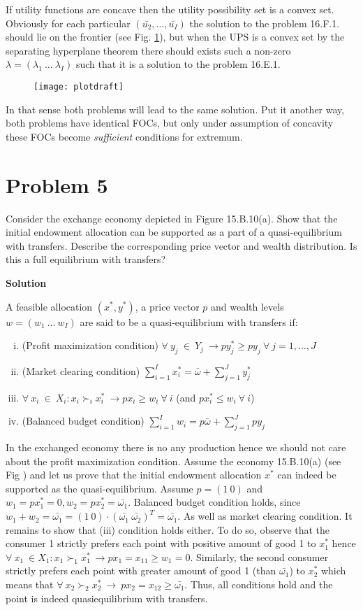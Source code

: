 \documentclass[a4paper]{article}
\begin{document}
If utility functions are concave then the utility possibility set is a convex set. Obviously for each particular $(\bar{u_2}, \dots, \bar{u_I})$ the solution to the problem 16.F.1. should lie on the frontier (see Fig. \ref{fig2}), but when the UPS is a convex set by the separating hyperplane theorem there should exists such a non-zero $\lambda = (\lambda_1\ \dots\ \lambda_I)$ such that it is a solution to the problem 16.E.1.
	\begin{figure}[h]
	\centering
	\texttt{[image: plotdraft]}
	\caption{}\label{fig2}
\end{figure}
In that sense both problems will lead to the same solution. Put it another way, both problems have identical FOCs, but only under assumption of concavity these FOCs become \textit{sufficient} conditions for extremum.
\section*{Problem 5}
Consider the exchange economy depicted in Figure 15.B.10(a). Show that the initial
endowment allocation can be supported as a part of a quasi-equilibrium with transfers.
Describe the corresponding price vector and wealth distribution. Is this a full equilibrium
with transfers?


\textbf{Solution}



A feasible allocation $(x^*, y^*)$, a price vector $p$ and wealth levels $w = (w_1\ \dots\ w_I)$ are said to be a quasi-equilibrium with transfers if:
\begin{enumerate}[(i)]
	\item (Profit maximization condition) $\forall\ y_j\ \in\ Y_j\ \to py_j^* \ge py_j\ \forall\ j = 1, \dots, J$
	\item (Market clearing condition) $\sum_{i=1}^I x^*_i = \bar{\omega} + \sum_{j=1}^Jy^*_j$
	\item $\forall\ x_i\ \in\ X_i: x_i \succ_i x_i^*\ \to px_i \ge w_i\ \forall\ i$ (and $px_i^* \le w_i\ \forall\ i$)
	\item (Balanced budget condition) $\sum_{i=1}^Iw_i = p\bar{\omega} + \sum_{j=1}^J py_j$
\end{enumerate}
In the exchanged economy there is no any production hence we should not care about the profit maximization condition. Assume the economy 15.B.10(a) (see Fig ) and let us prove that the initial endowment allocation $x^*$ can indeed be supported as the quasi-equilibrium. Assume $p = (1\ 0)$ and $w_1 = px_1^* = 0, w_2 = px^*_2 = \bar{\omega_1}$. Balanced budget condition holds, since $w_1 + w_2 = \bar{\omega_1} = (1\ 0) \cdot (\bar{\omega_1}\ \bar{\omega_2})^T = \bar{\omega_1}$. As well as market clearing condition. It remains to show that (iii) condition holds either. To do so, observe that the consumer 1 strictly prefers each point with positive amount of good 1 to $x_1^*$ hence $\forall\ x_1\ \in X_1: x_1 \succ_1 x_1^*\ \to px_1 = x_{11} \ge w_1 = 0$. Similarly, the second consumer strictly prefers each point with greater amount of good 1 (than $\bar{\omega_1}$) to $x_2^*$ which means that $\forall\ x_2 \succ_2 x_2^*\ \to\ px_2 = x_{12} \ge \bar{\omega_1}$. Thus, all conditions hold and the point is indeed quasiequilibrium with transfers.
\end{document}
